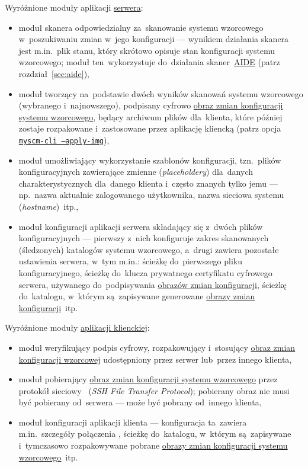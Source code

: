 \documentclass[thesis]{subfiles}
\begin{document}
Wyróżnione moduły aplikacji \hyperref[sec:srv-app]{serwera}:\mynobreakpar
\begin{itemize}
	\item moduł skanera odpowiedzialny za~skanowanie systemu wzorcowego w~poszukiwaniu zmian w~jego konfiguracji --- wynikiem działania skanera jest m.in.~plik stanu, który skrótowo opisuje stan konfiguracji systemu wzorcowego; moduł ten~wykorzystuje do~działania skaner~\hyperref[sec:aide]{AIDE} (patrz rozdział~\ref{sec:aide}),
	\item moduł tworzący na~podstawie dwóch wyników skanowań systemu wzorcowego (wybranego i~najnowszego), podpisany cyfrowo \hyperref[sec:obraz-zmian-konfiguracji]{obraz zmian konfiguracji systemu wzorcowego}, będący archiwum plików dla~klienta, które później zostaje rozpakowane i~zastosowane przez aplikację kliencką (patrz opcja \hyperlink{itm:apply-img}{\texttt{myscm-cli --apply-img}}),
	\item moduł umożliwiający wykorzystanie szablonów konfiguracji, tzn.~plików konfiguracyjnych zawierające zmienne (\emph{placeholdery}) dla~danych charakterystycznych dla~danego klienta i~często znanych tylko jemu --- np.~nazwa aktualnie zalogowanego użytkownika, nazwa sieciowa systemu (\emph{hostname})~itp.,
	\item moduł konfiguracji aplikacji serwera składający się z~dwóch plików konfiguracyjnych --- pierwszy z~nich konfiguruje zakres skanowanych (śledzonych) katalogów systemu wzorcowego, a~drugi zawiera pozostałe ustawienia serwera, w~tym m.in.: ścieżkę do~pierwszego pliku konfiguracyjnego, ścieżkę do~klucza prywatnego certyfikatu cyfrowego serwera, używanego do~podpisywania \hyperref[sec:obraz-zmian-konfiguracji]{obrazów zmian konfiguracji}, ścieżkę do~katalogu, w~którym są~zapisywane generowane \hyperref[sec:obraz-zmian-konfiguracji]{obrazy zmian konfiguracji}~itp.
\end{itemize}

Wyróżnione moduły \hyperref[sec:cli-app]{aplikacji klienckiej}:\mynobreakpar
\begin{itemize}
	\item moduł weryfikujący podpis cyfrowy, rozpakowujący i~stosujący \hyperref[sec:obraz-zmian-konfiguracji]{obraz zmian konfiguracji wzorcowej} udostępniony przez serwer lub~przez innego klienta,
	\item moduł pobierający \hyperref[sec:obraz-zmian-konfiguracji]{obraz zmian konfiguracji systemu wzorcowego} przez protokół sieciowy \sftp{}~(\emph{SSH File Transfer Protocol}); pobierany obraz nie musi być pobierany od~serwera --- może być pobrany od~innego klienta,
	\item moduł konfiguracji aplikacji klienta --- konfiguracja ta~zawiera m.in.~szczegóły połączenia \sftp{}, ścieżkę do~katalogu, w~którym są~zapisywane i~tymczasowo rozpakowywane pobrane \hyperref[sec:obraz-zmian-konfiguracji]{obrazy zmian konfiguracji systemu wzorcowego}~itp.
\end{itemize}
\end{document}
